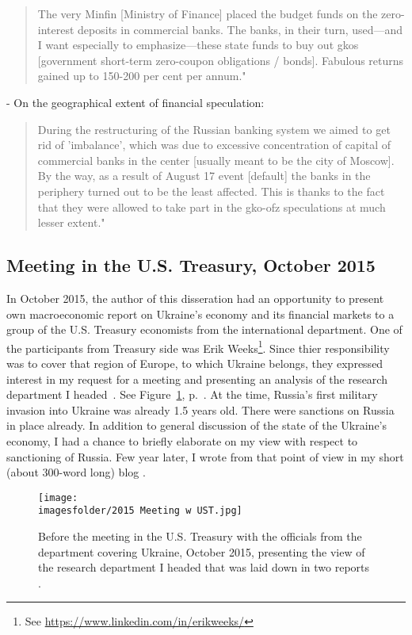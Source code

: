 \begin{quote}
The very Minfin [Ministry of Finance] placed the budget funds on the zero-interest deposits in commercial banks. The banks, in their turn, used---and I want especially to emphasize---these state funds to buy out \acp{gko} [government short-term zero-coupon obligations / bonds]. Fabulous returns gained up to 150-200 per cent per annum." \citep[p.~27]{primakov2002}
\end{quote}

- On the geographical extent of financial speculation:

\begin{quote}
During the restructuring of the Russian banking system we aimed to get rid of 'imbalance', which was due to excessive concentration of capital of commercial banks in the center [usually meant to be the city of Moscow]. By the way, as a result of August 17 event [default] the banks in the periphery turned out to be the least affected. This is thanks to the fact that they were allowed to take part in the \ac{gko}-\ac{ofz} speculations at much lesser extent." \citep[p.~53]{primakov2002}
\end{quote}

\subsection{Meeting in the U.S. Treasury, October 2015}

In October 2015, the author of this disseration had an opportunity to present own macroeconomic report on Ukraine's economy and its financial markets to a group of the U.S. Treasury economists from the international department. One of the participants from Treasury side was Erik Weeks\footnote{See {\small\url{https://www.linkedin.com/in/erikweeks/}}}. Since thier responsibility was to cover that region of Europe, to which Ukraine belongs, they expressed interest in my request for a meeting and presenting an analysis of the research department I headed~\citep{valchyshen_2015_,valchyshen_2015}. See Figure~\ref{fig:us_treasury_2015}, p.~\pageref{fig:us_treasury_2015}. At the time, Russia's first military invasion into Ukraine was already 1.5 years old. There were sanctions on Russia in place already. In addition to general discussion of the state of the Ukraine's economy, I had a chance to briefly elaborate on my view with respect to sanctioning of Russia. Few year later, I wrote from that point of view in my short (about 300-word long) blog \citep[see][]{valchyshen_2018}. 

\begin{figure}[!htbp]
    \captionsetup{width=1\linewidth,labelfont=bf}
    \centering
    \texttt{[image: \\imagesfolder/2015 Meeting w UST.jpg]}
    \caption[Before the meeting in the U.S. Treasury with the officials from the department covering Ukraine, October 2015]%
    {Before the meeting in the U.S. Treasury with the officials from the department covering Ukraine, October 2015, presenting the view of the research department I headed that was laid down in two reports \citep{valchyshen_2015_,valchyshen_2015}.}
    \label{fig:us_treasury_2015}
\end{figure}
